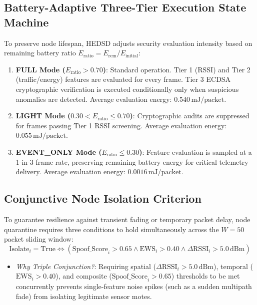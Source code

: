 \documentclass[conference]{IEEEtran}
\begin{document}
\subsection{Battery-Adaptive Three-Tier Execution State Machine}
To preserve node lifespan, HEDSD adjusts security evaluation intensity based on remaining battery ratio $E_{\text{ratio}} = E_{\text{rem}} / E_{\text{initial}}$:
\begin{enumerate}
    \item \textbf{FULL Mode ($E_{\text{ratio}} > 0.70$)}: Standard operation. Tier 1 (RSSI) and Tier 2 (traffic/energy) features are evaluated for every frame. Tier 3 ECDSA cryptographic verification is executed conditionally only when suspicious anomalies are detected. Average evaluation energy: $0.540\,\text{mJ/packet}$.
    \item \textbf{LIGHT Mode ($0.30 < E_{\text{ratio}} \le 0.70$)}: Cryptographic audits are suppressed for frames passing Tier 1 RSSI screening. Average evaluation energy: $0.055\,\text{mJ/packet}$.
    \item \textbf{EVENT\_ONLY Mode ($E_{\text{ratio}} \le 0.30$)}: Feature evaluation is sampled at a 1-in-3 frame rate, preserving remaining battery energy for critical telemetry delivery. Average evaluation energy: $0.0016\,\text{mJ/packet}$.
\end{enumerate}

\subsection{Conjunctive Node Isolation Criterion}
To guarantee resilience against transient fading or temporary packet delay, node quarantine requires three conditions to hold simultaneously across the $W=50$ packet sliding window:
\begin{equation}
\label{eq_isolation_rule}
\text{Isolate}_i = \text{True} \iff \left( \text{Spoof\_Score}_i > 0.65 \land \text{EWS}_i > 0.40 \land \Delta\text{RSSI}_i > 5.0\,\text{dBm} \right)
\end{equation}
\begin{itemize}
    \item \textit{Why Triple Conjunction?}: Requiring spatial ($\Delta\text{RSSI}_i > 5.0\,\text{dBm}$), temporal ($\text{EWS}_i > 0.40$), and composite ($\text{Spoof\_Score}_i > 0.65$) thresholds to be met concurrently prevents single-feature noise spikes (such as a sudden multipath fade) from isolating legitimate sensor motes.
\end{itemize}
\end{document}
